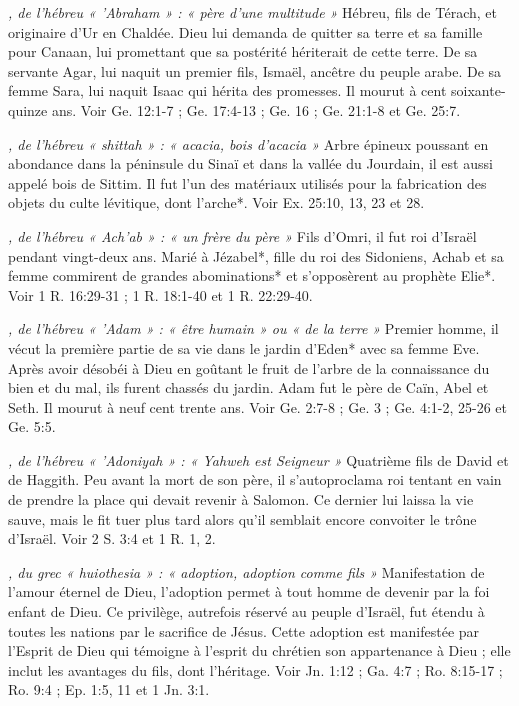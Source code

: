 \begin{multicols}{2}
\textit{, de l'hébreu « 'Abraham » : « père d'une multitude »}\newline
Hébreu, fils de Térach, et originaire d'Ur en Chaldée. Dieu lui demanda de quitter sa terre et sa famille pour Canaan, lui promettant que sa postérité hériterait de cette terre. De sa servante Agar, lui naquit un premier fils, Ismaël, ancêtre du peuple arabe. De sa femme Sara, lui naquit Isaac qui hérita des promesses. Il mourut à cent soixante-quinze ans. Voir Ge. 12:1-7 ; Ge. 17:4-13 ; Ge. 16 ; Ge. 21:1-8 et Ge. 25:7.

\textit{, de l'hébreu « shittah » : « acacia, bois d'acacia »}\newline
Arbre épineux poussant en abondance dans la péninsule du Sinaï et dans la vallée du Jourdain, il est aussi appelé bois de Sittim. Il fut l'un des matériaux utilisés pour la fabrication des objets du culte lévitique, dont l'arche*. Voir Ex. 25:10, 13, 23 et 28.

\textit{, de l'hébreu « Ach'ab » : « un frère du père »}\newline
Fils d'Omri, il fut roi d'Israël pendant vingt-deux ans. Marié à Jézabel*, fille du roi des Sidoniens, Achab et sa femme commirent de grandes abominations* et s'opposèrent au prophète Elie*. Voir 1 R. 16:29-31 ; 1 R. 18:1-40 et 1 R. 22:29-40.

\textit{, de l'hébreu « 'Adam » : « être humain » ou « de la terre »}\newline
Premier homme, il vécut la première partie de sa vie dans le jardin d'Eden* avec sa femme Eve. Après avoir désobéi à Dieu en goûtant le fruit de l'arbre de la connaissance du bien et du mal, ils furent chassés du jardin. Adam fut le père de Caïn, Abel et Seth. Il mourut à neuf cent trente ans. Voir Ge. 2:7-8 ; Ge. 3 ; Ge. 4:1-2, 25-26 et Ge. 5:5.

\textit{, de l'hébreu « 'Adoniyah » : « Yahweh est Seigneur »}\newline
Quatrième fils de David et de Haggith. Peu avant la mort de son père, il s'autoproclama roi tentant en vain de prendre la place qui devait revenir à Salomon. Ce dernier lui laissa la vie sauve, mais le fit tuer plus tard alors qu'il semblait encore convoiter le trône d'Israël. Voir 2 S. 3:4 et 1 R. 1, 2.

\textit{, du grec « huiothesia » : « adoption, adoption comme fils »}\newline
Manifestation de l'amour éternel de Dieu, l'adoption permet à tout homme de devenir par la foi enfant de Dieu. Ce privilège, autrefois réservé au peuple d'Israël, fut étendu à toutes les nations par le sacrifice de Jésus. Cette adoption est manifestée par l'Esprit de Dieu qui témoigne à l'esprit du chrétien son appartenance à Dieu ; elle inclut les avantages du fils, dont l'héritage. Voir Jn. 1:12 ; Ga. 4:7 ; Ro. 8:15-17 ; Ro. 9:4 ; Ep. 1:5, 11 et 1 Jn. 3:1.


\end{multicols}
